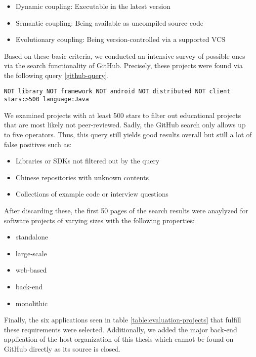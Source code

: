 \documentclass[12pt,a4paper]{report}
\begin{document}
\begin{itemize}[noitemsep]
    \item Dynamic coupling: Executable in the latest version
    \item Semantic coupling: Being available as uncompiled source code
    \item Evolutionary coupling: Being version-controlled via a supported VCS
\end{itemize}

Based on these basic criteria, we conducted an intensive survey of possible ones
via the search functionality of GitHub. Precisely, these projects were found via
the following query \ref{github-query}.

\begin{lstlisting}[caption=GitHub experiment subjects search query, label=github-query, breaklines=true, basicstyle=\scriptsize\ttfamily]
NOT library NOT framework NOT android NOT distributed NOT client stars:>500 language:Java
\end{lstlisting}

We examined projects with at least 500 stars to filter out educational projects
that are most likely not peer-reviewed.
Sadly, the GitHub search only allows up to five  operators.
Thus, this query still yields good results overall but still a lot of false positives such as:

\begin{itemize}[noitemsep]
    \item Libraries or SDKs not filtered out by the query
    \item Chinese repositories with unknown contents
    \item Collections of example code or interview questions
\end{itemize}

After discarding these, the first 50 pages of the search results were anaylyzed
for software projects of varying sizes with the following properties:

\begin{itemize}[noitemsep]
    \item standalone
    \item large\hyp scale
    \item web\hyp based
    \item back\hyp end
    \item monolithic
\end{itemize}

Finally, the six applications seen in table \ref{table:evaluation-projects}
that fulfill these requirements were selected.
Additionally, we added the major back-end application of the host organization
of this thesis which cannot be found on GitHub directly as its source is closed.
\end{document}
